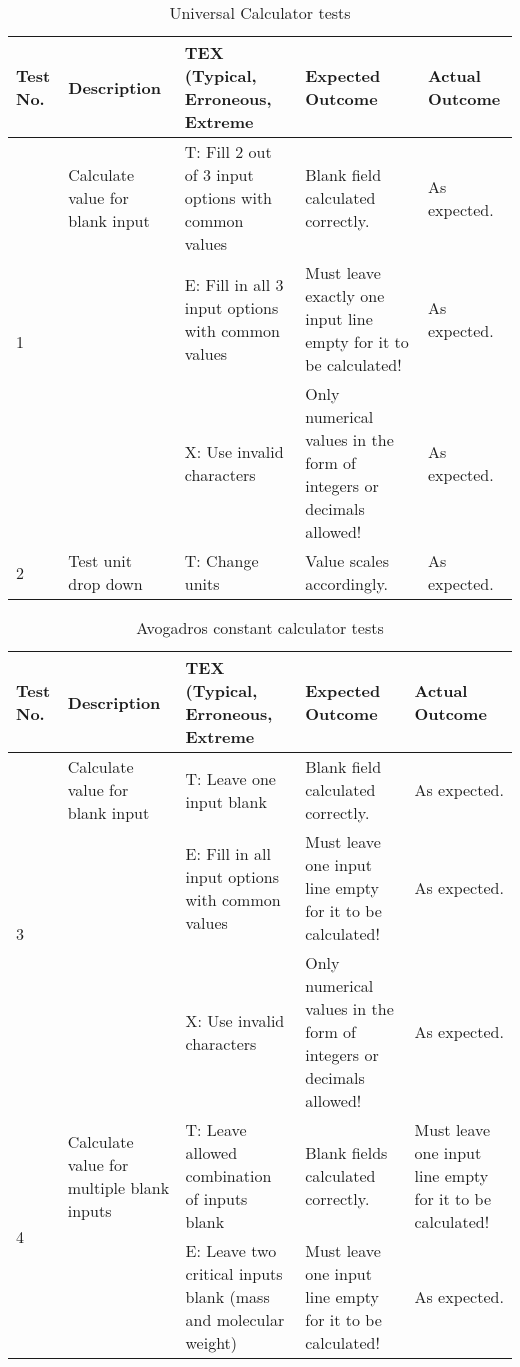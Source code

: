 \documentclass[a4paper,12pt]{article}
\begin{document}
\begin{table}[htbp]
\centering
\begin{tabularx}{\textwidth}{|p{1cm}|X|X|X|X|}
\hline
\textbf{Test No.} & \textbf{Description} & \textbf{TEX (Typical, Erroneous, Extreme} & \textbf{Expected Outcome} & \textbf{Actual Outcome} \\
\hline
\multirow{3}{*}{1} & Calculate value for blank input & T: Fill 2 out of 3 input options with common values & Blank field calculated correctly. & As expected.\\
\cline{3-5}
& & E: Fill in all 3 input options with common values & Must leave exactly one input line empty for it to be calculated! & As expected.\\
\cline{3-5}
& & X: Use invalid characters & Only numerical values in the form of integers or decimals allowed! & As expected.\\

\hline

\multirow{3}{*}{2} & Test unit drop down  & T: Change units & Value scales accordingly. & As expected.\\

\hline
\end{tabularx}
\caption{Universal Calculator tests}
\label{tab:calculator_tests}
\end{table}

\begin{table}[htbp]
\centering
\begin{tabularx}{\textwidth}{|p{1cm}|X|X|X|X|}
\hline
\textbf{Test No.} & \textbf{Description} & \textbf{TEX (Typical, Erroneous, Extreme} & \textbf{Expected Outcome} & \textbf{Actual Outcome} \\
\hline
\multirow{3}{*}{3} & Calculate value for blank input & T: Leave one input blank & Blank field calculated correctly. & As expected.\\
\cline{3-5}
& & E: Fill in all input options with common values & Must leave one input line empty for it to be calculated! & As expected.\\
\cline{3-5}
& & X: Use invalid characters & Only numerical values in the form of integers or decimals allowed! & As expected.\\

\hline
\multirow{3}{*}{4} & Calculate value for multiple blank inputs & T: Leave allowed combination of inputs blank & Blank fields calculated correctly. & Must leave one input line empty for it to be calculated!\\
\cline{3-5}
& & E: Leave two critical inputs blank (mass and molecular weight) & Must leave one input line empty for it to be calculated! & As expected.\\
\hline
\end{tabularx}
\caption{Avogadros constant calculator tests}
\label{tab:avogadros_tests}
\end{table}
\end{document}
